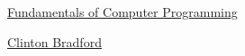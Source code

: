 \documentclass[11pt]{article}
\begin{document}
	\kaishu 
	\setcounter{section}{0}
	\begin{center}
		{\LARGE  \href{https://www.math.purdue.edu/~bradfor3/ProgrammingFundamentals/}{Fundamentals of Computer Programming}}
		
		
		{\large \href{https://www.clintonbradford.com/}{Clinton Bradford}}
	\end{center}
\setcounter{page}{1}



\vspace{-1cm}
\end{document}
